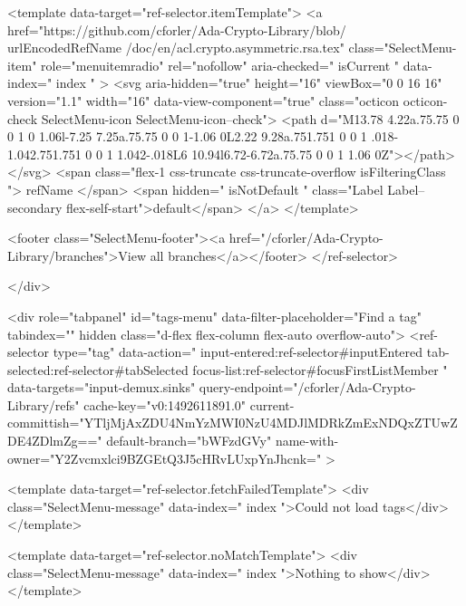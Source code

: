 <template data-target="ref-selector.itemTemplate">
  <a href="https://github.com/cforler/Ada-Crypto-Library/blob/{{ urlEncodedRefName }}/doc/en/acl.crypto.asymmetric.rsa.tex" class="SelectMenu-item" role="menuitemradio" rel="nofollow" aria-checked="{{ isCurrent }}" data-index="{{ index }}" >
    <svg aria-hidden="true" height="16" viewBox="0 0 16 16" version="1.1" width="16" data-view-component="true" class="octicon octicon-check SelectMenu-icon SelectMenu-icon--check">
    <path d="M13.78 4.22a.75.75 0 0 1 0 1.06l-7.25 7.25a.75.75 0 0 1-1.06 0L2.22 9.28a.751.751 0 0 1 .018-1.042.751.751 0 0 1 1.042-.018L6 10.94l6.72-6.72a.75.75 0 0 1 1.06 0Z"></path>
</svg>
    <span class="flex-1 css-truncate css-truncate-overflow {{ isFilteringClass }}">{{ refName }}</span>
    <span hidden="{{ isNotDefault }}" class="Label Label--secondary flex-self-start">default</span>
  </a>
</template>


              <footer class="SelectMenu-footer"><a href="/cforler/Ada-Crypto-Library/branches">View all branches</a></footer>
          </ref-selector>

        </div>

        <div role="tabpanel" id="tags-menu" data-filter-placeholder="Find a tag" tabindex="" hidden class="d-flex flex-column flex-auto overflow-auto">
          <ref-selector
            type="tag"
            data-action="
              input-entered:ref-selector#inputEntered
              tab-selected:ref-selector#tabSelected
              focus-list:ref-selector#focusFirstListMember
            "
            data-targets="input-demux.sinks"
            query-endpoint="/cforler/Ada-Crypto-Library/refs"
            cache-key="v0:1492611891.0"
            current-committish="YTljMjAxZDU4NmYzMWI0NzU4MDJlMDRkZmExNDQxZTUwZDE4ZDlmZg=="
            default-branch="bWFzdGVy"
            name-with-owner="Y2Zvcmxlci9BZGEtQ3J5cHRvLUxpYnJhcnk="
          >

            <template data-target="ref-selector.fetchFailedTemplate">
              <div class="SelectMenu-message" data-index="{{ index }}">Could not load tags</div>
            </template>

            <template data-target="ref-selector.noMatchTemplate">
              <div class="SelectMenu-message" data-index="{{ index }}">Nothing to show</div>
            </template>

              

